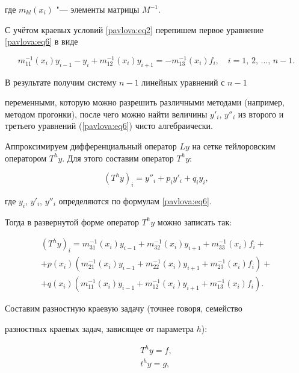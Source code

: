 где $m_{kl}(x_i)$ "--- элементы матрицы $M^{-1}$.



С учётом краевых условий \eqref{pavlova:eq2} перепишем первое уравнение \eqref{pavlova:eq6} в виде

\[

m_{11}^{-1} (x_i)y_{i-1} - y_i +m_{12}^{-1} (x_i)y_{i+1}

=-m_{13}^{-1} (x_i) f_i, \quad i=1,\,2,\,\ldots,\,n-1.

\]

В результате получим систему $n-1$ линейных уравнений с $n-1$

переменными, которую можно разрешить различными методами (например, методом прогонки), после чего можно найти величины $y'_i$, $y''_i$ из второго и третьего уравнений (\ref{pavlova:eq6}) чисто алгебраически.



Аппроксимируем дифференциальный оператор $Ly$ на сетке тейлоровским оператором $T^hy$. Для этого составим оператор $T^hy$:

\[

(T^hy)_i =y''_i +p_i y'_i +q_i y_i,

\]

где $y_i$, $y'_i$, $y''_i$ определяются по формулам \eqref{pavlova:eq6}. 

Тогда в развернутой форме оператор $T^hy$ можно записать так:

\begin{multline}

\label{pavlova:eq7}

(T^hy)_i =m_{31}^{-1} (x_i)y_{i-1}

+m_{32}^{-1} (x_i)y_{i+1} + m_{33}^{-1} (x_i) f_i + \\ +p(x_i)(m_{21}^{-1} (x_i)y_{i-1} +

m_{22}^{-1} (x_i )y_{i+1}

+m_{23}^{-1} (x_i )f_i )+\\+q(x_i)(m_{11}^{-1} (x_i)y_{i-1}  +m_{12}^{-1} (x_i )y_{i+1} +m_{13}^{-1}

(x_i )f_i ).

\end{multline}



Составим разностную краевую задачу (точнее говоря, семейство

разностных краевых задач, зависящее от параметра $h$):

\begin{gather}

\label{pavlova:eq8} T^hy=f,\\

\label{pavlova:eq9} t^hy=g,

\end{gather}

